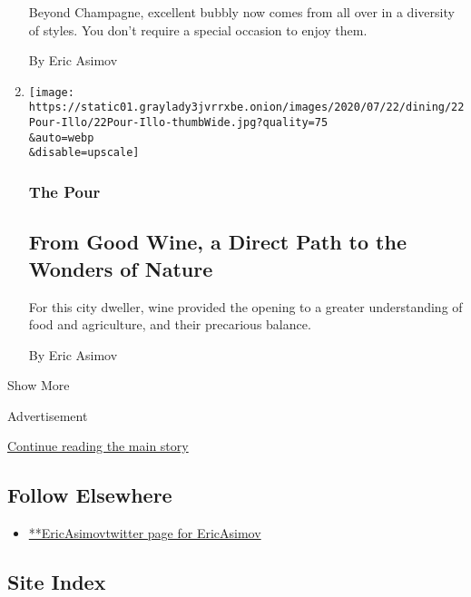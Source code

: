 \begin{enumerate}
  Beyond Champagne, excellent bubbly now comes from all over in a
  diversity of styles. You don't require a special occasion to enjoy
  them.

  By Eric Asimov
\item
  \href{/2020/07/20/dining/drinks/wine-vineyard-viticulture-farming.html}{}

  \texttt{[image: https://static01.graylady3jvrrxbe.onion/images/2020/07/22/dining/22Pour-Illo/22Pour-Illo-thumbWide.jpg?quality=75\\\&auto=webp\\\&disable=upscale]}

  \hypertarget{the-pour-4}{%
  \subsubsection{The Pour}\label{the-pour-4}}

  \hypertarget{from-good-wine-a-direct-path-to-the-wonders-of-nature}{%
  \subsection{From Good Wine, a Direct Path to the Wonders of
  Nature}\label{from-good-wine-a-direct-path-to-the-wonders-of-nature}}

  For this city dweller, wine provided the opening to a greater
  understanding of food and agriculture, and their precarious balance.

  By Eric Asimov
\end{enumerate}

Show More

Advertisement

\protect\hyperlink{after-mid2}{Continue reading the main story}

\hypertarget{follow-elsewhere}{%
\subsection{Follow Elsewhere}\label{follow-elsewhere}}

\begin{itemize}
\tightlist
\item
  \href{https://twitter.com/EricAsimov}{**EricAsimovtwitter page for
  EricAsimov}
\end{itemize}

\hypertarget{site-index}{%
\subsection{Site Index}\label{site-index}}

